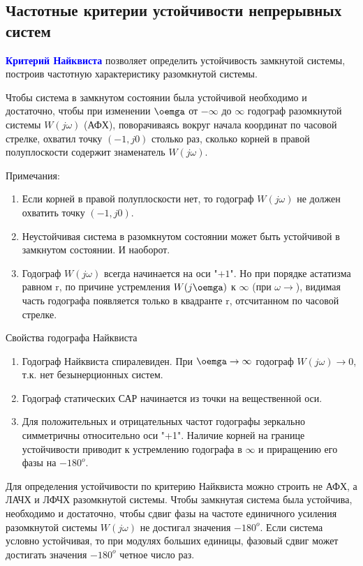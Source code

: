 \subsection{Частотные критерии устойчивости непрерывных систем}

\textcolor{blue}{\textbf{Критерий Найквиста}} позволяет определить устойчивость замкнутой системы, построив частотную характеристику разомкнутой системы.

Чтобы система в замкнутом состоянии была устойчивой необходимо и достаточно, чтобы при изменении $\oemga$ от $-\infty$ до $\infty$  годограф разомкнутой системы $W(j \omega)$ (АФХ), поворачиваясь вокруг начала координат по часовой стрелке, охватил точку $(−1,j0)$ столько раз, сколько корней в правой полуплоскости содержит знаменатель $W(j \omega)$.

Примечания:
\begin{enumerate}
    \item Если корней в правой полуплоскости нет, то годограф $W(j\omega)$ не должен охватить точку $(−1,j0)$.
    \item Неустойчивая система в разомкнутом состоянии может быть устойчивой в замкнутом состоянии. И наоборот.
    \item Годограф $W(j\omega)$ всегда начинается на оси "$+1$". Но при порядке астатизма равном r, по причине устремления $W(j\oemga)$ к $\infty$ (при $\omega \rightarrow$), видимая часть годографа появляется только в квадранте r, отсчитанном по часовой стрелке.
\end{enumerate}

Свойства годографа Найквиста
\begin{enumerate}
    \item Годограф Найквиста спиралевиден. При $\oemga \rightarrow \infty$ годограф $W(j\omega)\rightarrow 0$, т.к. нет безынерционных систем.
    \item Годограф статических САР начинается из точки на вещественной оси.
    \item Для положительных и отрицательных частот годографы зеркально симметричны относительно оси "+1". Наличие корней на границе устойчивости приводит к устремлению годографа в $\infty$ и приращению его фазы на $-180^o$.
\end{enumerate}

Для определения устойчивости по критерию Найквиста можно строить не АФХ, а ЛАЧХ и ЛФЧХ разомкнутой системы. Чтобы замкнутая система была устойчива, необходимо и достаточно, чтобы сдвиг фазы на частоте единичного усиления разомкнутой системы $W(j \omega)$ не достигал значения $-180^o$.
Если система условно устойчивая, то при модулях больших единицы, фазовый сдвиг может достигать значения $-180^o$ четное число раз.

